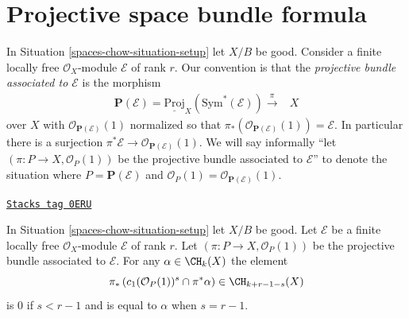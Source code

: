 \section{Projective space bundle formula}
\label{spaces-chow-section-projective-space-bundle-formula}
In Situation \ref{spaces-chow-situation-setup} let $X/B$ be good.
Consider a finite locally free $\mathcal{O}_X$-module
$\mathcal{E}$ of rank $r$.
Our convention is that the {\it projective bundle associated to
$\mathcal{E}$} is the morphism
$$
\begin{array}{cc}\mathbf{P}(\mathcal{E}) =
\underline{\text{Proj}}_X(\text{Sym}^*(\mathcal{E}))
\overset{\pi}{\longrightarrow} & X\end{array}
$$
over $X$ with
$\mathcal{O}_{\mathbf{P}(\mathcal{E})}(1)$ normalized so that
$\pi_*(\mathcal{O}_{\mathbf{P}(\mathcal{E})}(1)) = \mathcal{E}$.
In particular there is a surjection
$\pi^*\mathcal{E} \to \mathcal{O}_{\mathbf{P}(\mathcal{E})}(1)$.
We will say informally ``let $(\pi : P \to X, \mathcal{O}_P(1))$
be the projective bundle associated to $\mathcal{E}$'' to denote
the situation where $P = \mathbf{P}(\mathcal{E})$ and
$\mathcal{O}_P(1) = \mathcal{O}_{\mathbf{P}(\mathcal{E})}(1)$.

\begin{lemma}
\label{spaces-chow-lemma-cap-projective-bundle}
\href{https://stacks.math.columbia.edu/tag/0ERU}{\texttt{Stacks tag 0ERU}}

In Situation \ref{spaces-chow-situation-setup} let $X/B$ be good.
Let $\mathcal{E}$ be a finite locally free $\mathcal{O}_X$-module
$\mathcal{E}$ of rank $r$. Let $(\pi : P \to X, \mathcal{O}_P(1))$
be the projective bundle associated to $\mathcal{E}$.
For any $\alpha \in \CH_k(X)$ the element
$$
\pi_*\left(
c_1(\mathcal{O}_P(1))^s \cap \pi^*\alpha
\right)
\in
\CH_{k + r - 1 - s}(X)
$$
is $0$ if $s < r - 1$ and is equal to $\alpha$ when $s = r - 1$.
\end{lemma}

